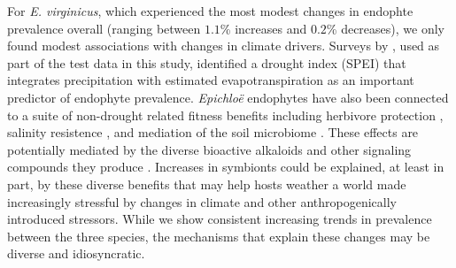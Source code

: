\documentclass[11pt]{article}
\begin{document}
For \emph{E. virginicus}, which experienced the most modest changes in endophte prevalence overall (ranging between $1.1$\% increases and $0.2$\% decreases), we only found modest associations with changes in climate drivers. 
Surveys by \citet{sneck2017variation}, used as part of the test data in this study, identified a drought index (SPEI) that integrates precipitation with estimated evapotranspiration as an important predictor of endophyte prevalence.
\emph{Epichloë} endophytes have also been connected to a suite of non-drought related fitness benefits including herbivore protection \citep{brem2001epichloe}, salinity resistence \citep{wang2020effects}, and mediation of the soil microbiome \citep{roberts2015rhizosphere}.
These effects are potentially mediated by the diverse bioactive alkaloids and other signaling compounds they produce \citep{saikkonen2013chemical}.
Increases in symbionts could be explained, at least in part, by these diverse benefits that may help hosts weather a world made increasingly stressful by changes in climate and other anthropogenically introduced stressors.
While we show consistent increasing trends in prevalence between the three species, the mechanisms that explain these changes may be diverse and idiosyncratic.
\end{document}

